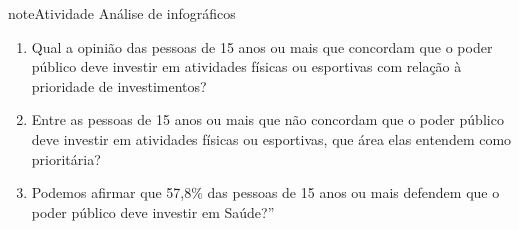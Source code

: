 \begin{sphinxadmonition}{note}{Atividade}{ Análise de infográficos}
\begin{enumerate}
\item {} 
Qual a opinião das pessoas de 15 anos ou mais que concordam que o poder público deve investir em atividades físicas ou esportivas com relação à prioridade de investimentos?

\item {} 
Entre as pessoas de 15 anos ou mais que não concordam que o poder público deve investir em atividades físicas ou esportivas, que área elas entendem como prioritária?

\item {} 
Podemos afirmar que 57,8\% das pessoas de 15 anos ou mais defendem que o poder público deve investir em Saúde?''

\end{enumerate}
\end{sphinxadmonition}

